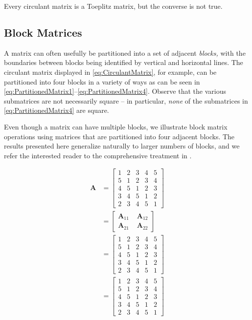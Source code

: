 \documentclass[graybox,envcountchap,sectrefs]{svmono}\usepackage[]{graphicx}\usepackage[]{xcolor}
\begin{document}
\begin{appendices}
Every circulant matrix is a Toeplitz matrix, but the converse is not
true.

\subsection{Block Matrices}

A matrix can often usefully be partitioned into a set of adjacent
\emph{blocks, }with the boundaries between blocks being identified
by vertical and horizontal lines. The circulant matrix displayed in
\eqref{eq:CirculantMatrix}, for example, can be partitioned into
four blocks in a variety of ways as can be seen in \eqref{eq:PartitionedMatrix1}--\eqref{eq:PartitionedMatrix4}.
Observe that the various submatrices are not necessarily square --
in particular, \emph{none} of the submatrices in \eqref{eq:PartitionedMatrix4}
are square. 

Even though a matrix can have multiple blocks, we illustrate block
matrix operations using matrices that are partitioned into four adjacent
blocks. The results presented here generalize naturally to larger
numbers of blocks, and we refer the interested reader to the comprehensive
treatment in \citet{Gentle2017}.

\begin{subequations}
\begin{align}
\mathrm{\mathbf{A}} & =\left[\begin{array}{ccccc}
1 & 2 & 3 & 4 & 5\\
5 & 1 & 2 & 3 & 4\\
4 & 5 & 1 & 2 & 3\\
3 & 4 & 5 & 1 & 2\\
2 & 3 & 4 & 5 & 1
\end{array}\right]\label{eq:PartitionedMatrix1}\\[0.5em]
 & =\left[\begin{array}{c|c}
\mathrm{\mathbf{A}}_{11}\, & \,\mathrm{\mathbf{A}}_{12}\\
\hline \mathrm{\mathbf{A}}_{21}\, & \,\mathrm{\mathbf{A}}_{22}
\end{array}\right]\label{eq:PartitionedMatrix2}\\[0.5em]
 & =\left[\begin{array}{cc|ccc}
1 & 2 & 3 & 4 & 5\\
5 & 1 & 2 & 3 & 4\\
\hline 4 & 5 & 1 & 2 & 3\\
3 & 4 & 5 & 1 & 2\\
2 & 3 & 4 & 5 & 1
\end{array}\right]\label{eq:PartitionedMatrix3}\\[0.5em]
 & =\left[\begin{array}{ccc|cc}
1 & 2 & 3 & 4 & 5\\
\hline 5 & 1 & 2 & 3 & 4\\
4 & 5 & 1 & 2 & 3\\
3 & 4 & 5 & 1 & 2\\
2 & 3 & 4 & 5 & 1
\end{array}\right]\label{eq:PartitionedMatrix4}
\end{align}
\end{subequations}


\end{appendices}
\end{document}

